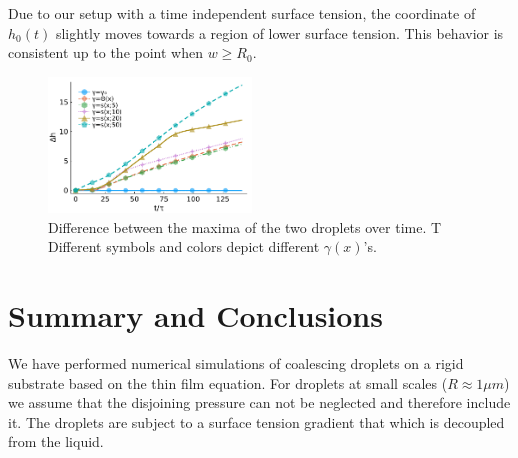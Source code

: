 \documentclass[twocolumn,amsmath,amssymb,showpacs,pre,nofootinbib,superscriptaddress]{revtex4-1} %
\begin{document}
Due to our setup with a time independent surface tension, the coordinate of $h_0(t)$ slightly moves towards a region of lower surface tension.
This behavior is consistent up to the point when $w \geq R_0$. 

\begin{figure}
    \centering
    \includegraphics[width=0.48\textwidth]{Figures/hdiff.pdf}
    \caption{Difference between the maxima of the two droplets over time.
    T
    Different symbols and colors depict different $\gamma(x)$'s.}
    \label{fig:drop_diff}
\end{figure}

\section{Summary and Conclusions}\label{sec:sum_conclu}
We have performed numerical simulations of coalescing droplets on a rigid substrate based on the thin film equation.
For droplets at small scales ($R \approx 1\mu m$) we assume that the disjoining pressure can not be neglected and therefore include it. 
The droplets are subject to a surface tension gradient that which is decoupled from the liquid.


\begin{acknowledgements}

\end{acknowledgements}

    
\end{document}

